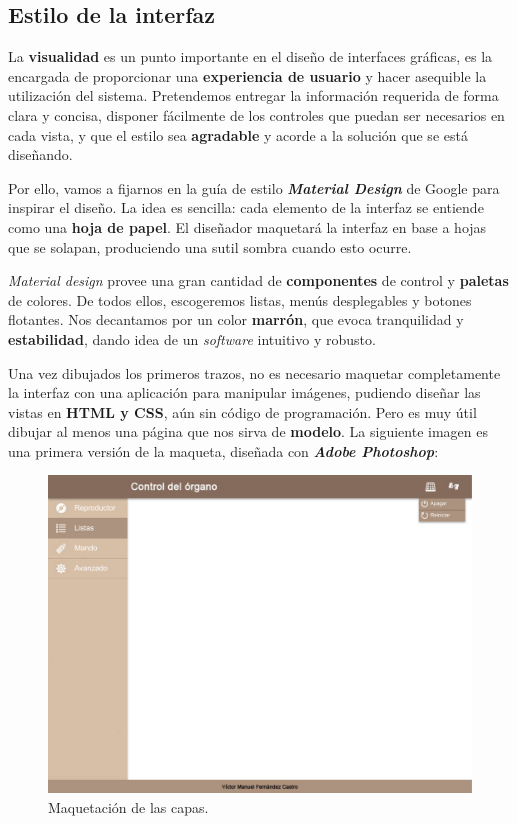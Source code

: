 \subsection{Estilo de la interfaz}

La \textbf{visualidad} es un punto importante en el diseño de interfaces gráficas, es la encargada de proporcionar una \textbf{experiencia de usuario} y hacer asequible la utilización del sistema. Pretendemos entregar la información requerida de forma clara y concisa, disponer fácilmente de los controles que puedan ser necesarios en cada vista, y que el estilo sea \textbf{agradable} y acorde a la solución que se está diseñando.

Por ello, vamos a fijarnos en la guía de estilo \textbf{\textit{Material Design}} de Google \cite{material} para inspirar el diseño. La idea es sencilla: cada elemento de la interfaz se entiende como una \textbf{hoja de papel}. El diseñador maquetará la interfaz en base a hojas que se solapan, produciendo una sutil sombra cuando esto ocurre.

\textit{Material design} provee una gran cantidad de \textbf{componentes} de control y \textbf{paletas} de colores. De todos ellos, escogeremos listas, menús desplegables y botones flotantes. Nos decantamos por un color \textbf{marrón}, que evoca tranquilidad y \textbf{estabilidad}, dando idea de un \textit{software} intuitivo y robusto.

Una vez dibujados los primeros trazos, no es necesario maquetar completamente la interfaz con una aplicación para manipular imágenes, pudiendo diseñar las vistas en \textbf{\acrshort{HTML} y \acrshort{CSS}}, aún sin código de programación. Pero es muy útil dibujar al menos una página que nos sirva de \textbf{modelo}. La siguiente imagen es una primera versión de la maqueta, diseñada con \textbf{\textit{Adobe Photoshop}}:

\smallskip

\begin{figure}[H]
	\noindent \begin{centering}
		\includegraphics[width=\linewidth*3/4]{capitulo4/maqueta}
		\par\end{centering}
	\smallskip
	\caption{\label{fig:maqueta} Maquetación de las capas.}
\end{figure}

